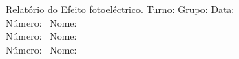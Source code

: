 \documentclass[a4paper,12pt]{article}  %
\author{Prof. Bernardo B. Carvalho}
\date{ Outubro 2014}
\newcommand{\HRule}{\rule{\linewidth}{0.5mm}}
\begin{document}
 



{  \sf  Relatório do Efeito fotoeléctrico.} %
Turno:\underline{\makebox[0.7cm][l]{~}} Grupo:\underline{\makebox[0.7cm][l]{~}} Data:\underline{\makebox[2cm][l]{~}}\\
\noindent Número:~\underline{\makebox[2cm][r]{~}} Nome:~\underline{\makebox[10cm][r]{~}} \\
\noindent Número:~\underline{\makebox[2cm][r]{~}} Nome:~\underline{\makebox[10cm][r]{~}} \\
\noindent Número:~\underline{\makebox[2cm][r]{~}} Nome:~\underline{\makebox[10cm][r]{~}} 
\end{document}
